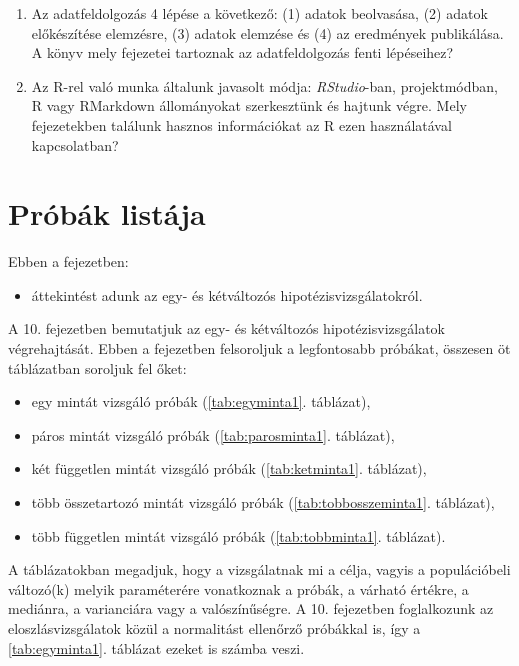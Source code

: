 \documentclass[
]{book}
\makeatletter
\providecommand{\tightlist}{%
  \setlength{\itemsep}{0pt}\setlength{\parskip}{0pt}}
\newenvironment{kframe}{%
\medskip{}
\setlength{\fboxsep}{.8em}
 \def\at@end@of@kframe{}%
 \ifinner\ifhmode%
  \def\at@end@of@kframe{\end{minipage}}%
  \begin{minipage}{\columnwidth}%
 \fi\fi%
 \def\FrameCommand##1{\hskip\@totalleftmargin \hskip-\fboxsep
 \colorbox{shadecolor}{##1}\hskip-\fboxsep
     \hskip-\linewidth \hskip-\@totalleftmargin \hskip\columnwidth}%
 \MakeFramed {\advance\hsize-\width
   \@totalleftmargin\z@ \linewidth\hsize
   \@setminipage}}%
 {\par\unskip\endMakeFramed%
 \at@end@of@kframe}
\newenvironment{rmdblock}[1]
  {
  \begin{itemize}
  \renewcommand{\labelitemi}{
    \raisebox{-.7\height}[0pt][0pt]{
      {\setkeys{Gin}{width=3em,keepaspectratio}\texttt{[image: images/\#1]}}
    }
  }
  \setlength{\fboxsep}{1em}
  \begin{kframe}
  \item
  }
  {
  \end{kframe}
  \end{itemize}
  }
\newenvironment{rmdlevel3}
  {\begin{rmdblock}{level3}}
  {\end{rmdblock}}
\newenvironment{rmdexercise}
  {\begin{rmdblock}{exercise}}
  {\end{rmdblock}}
\makeatother
\begin{document}
\begin{rmdexercise}
\begin{enumerate}
\def\labelenumi{\arabic{enumi}.}
\tightlist
\item
  Az adatfeldolgozás 4 lépése a következő: (1) adatok beolvasása, (2) adatok előkészítése elemzésre, (3) adatok elemzése és (4) az eredmények publikálása. A könyv mely fejezetei tartoznak az adatfeldolgozás fenti lépéseihez?
\item
  Az R-rel való munka általunk javasolt módja: \emph{RStudio}-ban, projektmódban, R vagy RMarkdown állományokat szerkesztünk és hajtunk végre. Mely fejezetekben találunk hasznos információkat az R ezen használatával kapcsolatban?
\end{enumerate}
\end{rmdexercise}

\hypertarget{pruxf3buxe1k-listuxe1ja}{%
\section{Próbák listája}\label{pruxf3buxe1k-listuxe1ja}}

\begin{rmdlevel3}
Ebben a fejezetben:

\begin{itemize}
\tightlist
\item
  áttekintést adunk az egy- és kétváltozós hipotézisvizsgálatokról.
\end{itemize}
\end{rmdlevel3}

A 10. fejezetben bemutatjuk az egy- és kétváltozós hipotézisvizsgálatok végrehajtását. Ebben a fejezetben felsoroljuk a legfontosabb próbákat, összesen öt táblázatban soroljuk fel őket:

\begin{itemize}
\tightlist
\item
  egy mintát vizsgáló próbák (\ref{tab:egyminta1}. táblázat),
\item
  páros mintát vizsgáló próbák (\ref{tab:parosminta1}. táblázat),
\item
  két független mintát vizsgáló próbák (\ref{tab:ketminta1}. táblázat),
\item
  több összetartozó mintát vizsgáló próbák (\ref{tab:tobbosszeminta1}. táblázat),
\item
  több független mintát vizsgáló próbák (\ref{tab:tobbminta1}. táblázat).
\end{itemize}

A táblázatokban megadjuk, hogy a vizsgálatnak mi a célja, vagyis a populációbeli változó(k) melyik paraméterére vonatkoznak a próbák, a várható értékre, a mediánra, a varianciára vagy a valószínűségre. A 10. fejezetben foglalkozunk az eloszlásvizsgálatok közül a normalitást ellenőrző próbákkal is, így a \ref{tab:egyminta1}. táblázat ezeket is számba veszi.
\end{document}
